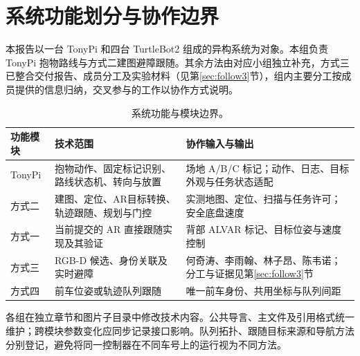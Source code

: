 \section{系统功能划分与协作边界}\label{sec:division}
本报告以一台 TonyPi 和四台 TurtleBot2 组成的异构系统为对象。本组负责 TonyPi 抱物路线与方式二建图避障跟随。其余方法由对应小组独立补充，方式三已整合交付报告、成员分工及实验材料（见第\ref{sec:follow3}节），组内主要分工按成员提供的信息归纳，交叉参与的工作以协作方式说明。
\begin{table}[H]\centering\small
\begin{tabularx}{\linewidth}{p{27mm}YY}\toprule
功能模块 & 技术范围 & 协作输入与输出\\\midrule
TonyPi & 抱物动作、固定标记识别、路线状态机、转向与放置 & 场地 A/B/C 标记；动作、日志、目标外观与任务状态适配\\
方式二 & 建图、定位、AR目标转换、轨迹跟随、规划与门控 & 实测地图、定位、扫描与任务许可；安全底盘速度\\
方式一 & 当前提交的 AR 直接跟随实现及其验证 & 背部 ALVAR 标记、目标位姿与速度控制\\
方式三 & RGB-D 候选、身份关联及实时避障 & 何奇涛、李雨翰、林子昂、陈韦诺；分工与证据见第\ref{sec:follow3}节\\
方式四 & 前车位姿或轨迹队列跟随 & 唯一前车身份、共用坐标与队列间距\\\bottomrule
\end{tabularx}\caption{系统功能与模块边界。}
\end{table}
各组在独立章节和图片子目录中修改技术内容。公共导言、主文件及引用格式统一维护；跨模块参数变化应同步记录接口影响。队列拓扑、跟随目标来源和导航方法分别登记，避免将同一控制器在不同车号上的运行视为不同方法。

